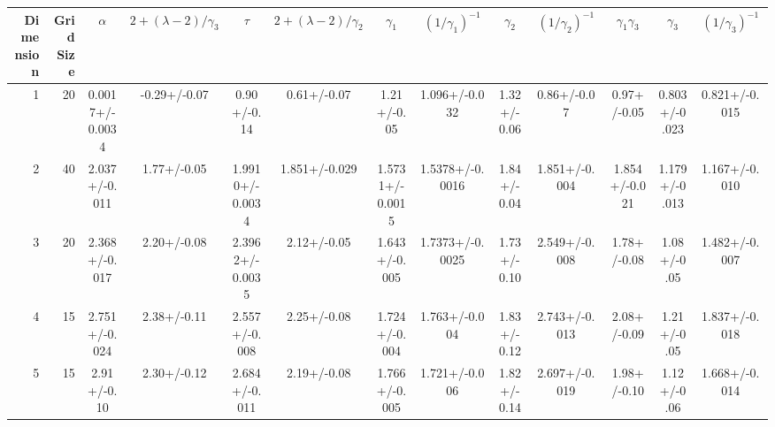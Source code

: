 \begin{tabular}{rr|ccccccccccc}
\toprule
Dimension & Grid Size & $\alpha$ & $2 + (\lambda - 2)/\gamma_3$ & $\tau$ & $2 + (\lambda - 2)/\gamma_2$ & $\gamma_1$ & $(1/\gamma_1)^{-1}$ & $\gamma_2$ & $(1/\gamma_2)^{-1}$ & $\gamma_1 \gamma_3$ & $\gamma_3$ & $(1/\gamma_3)^{-1}$ \\
\midrule
1 & 20 & 0.0017+/-0.0034 & -0.29+/-0.07 & 0.90+/-0.14 & 0.61+/-0.07 & 1.21+/-0.05 & 1.096+/-0.032 & 1.32+/-0.06 & 0.86+/-0.07 & 0.97+/-0.05 & 0.803+/-0.023 & 0.821+/-0.015 \\
2 & 40 & 2.037+/-0.011 & 1.77+/-0.05 & 1.9910+/-0.0034 & 1.851+/-0.029 & 1.5731+/-0.0015 & 1.5378+/-0.0016 & 1.84+/-0.04 & 1.851+/-0.004 & 1.854+/-0.021 & 1.179+/-0.013 & 1.167+/-0.010 \\
3 & 20 & 2.368+/-0.017 & 2.20+/-0.08 & 2.3962+/-0.0035 & 2.12+/-0.05 & 1.643+/-0.005 & 1.7373+/-0.0025 & 1.73+/-0.10 & 2.549+/-0.008 & 1.78+/-0.08 & 1.08+/-0.05 & 1.482+/-0.007 \\
4 & 15 & 2.751+/-0.024 & 2.38+/-0.11 & 2.557+/-0.008 & 2.25+/-0.08 & 1.724+/-0.004 & 1.763+/-0.004 & 1.83+/-0.12 & 2.743+/-0.013 & 2.08+/-0.09 & 1.21+/-0.05 & 1.837+/-0.018 \\
5 & 15 & 2.91+/-0.10 & 2.30+/-0.12 & 2.684+/-0.011 & 2.19+/-0.08 & 1.766+/-0.005 & 1.721+/-0.006 & 1.82+/-0.14 & 2.697+/-0.019 & 1.98+/-0.10 & 1.12+/-0.06 & 1.668+/-0.014 \\
\bottomrule
\end{tabular}
